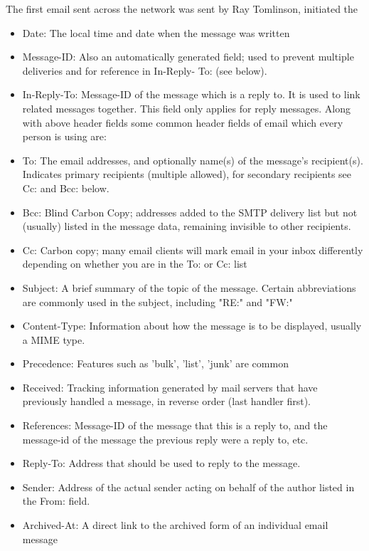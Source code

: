 \documentclass[10pt,twoside,english,a4paper]{article}
\begin{document}
\cite{emailmining} 
The first email sent across the network was sent by Ray Tomlinson, initiated the 
\begin{itemize}
\item Date: The local time and date when the message was
written
\item Message-ID: Also an automatically generated field; used
to prevent multiple deliveries and for reference in In-Reply-
To: (see below).
\item  In-Reply-To: Message-ID of the message which is a reply
to. It is used to link related messages together. This field
only applies for reply messages.
Along with above header fields some common header fields
of email which every person is using are:

\item To: The email addresses, and optionally name(s) of the
message's recipient(s). Indicates primary recipients
(multiple allowed), for secondary recipients see Cc: and
Bcc: below.
\item Bcc: Blind Carbon Copy; addresses added to the SMTP
delivery list but not (usually) listed in the message data,
remaining invisible to other recipients.
\item Cc: Carbon copy; many email clients will mark email in
your inbox differently depending on whether you are in the
To: or Cc: list
\item Subject: A brief summary of the topic of the message.
Certain abbreviations are commonly used in the subject,
including "RE:" and "FW:"
\item Content-Type: Information about how the message is to
be displayed, usually a MIME type.
\item Precedence: Features such as 'bulk', 'list', 'junk' are common
\item Received: Tracking information generated by mail
servers that have previously handled a message, in reverse
order (last handler first).
\item References: Message-ID of the message that this is a
reply to, and the message-id of the message the previous
reply were a reply to, etc.
\item Reply-To: Address that should be used to reply to the
message.
\item Sender: Address of the actual sender acting on behalf of
the author listed in the From: field.
\item Archived-At: A direct link to the archived form of an
individual email message

\end{itemize}
\end{document}
